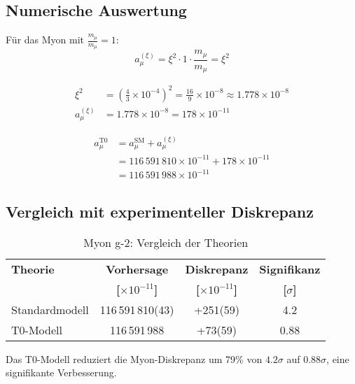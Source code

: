 \documentclass[12pt,a4paper]{article}
\newcommand{\xipar}{\xi}
\begin{document}
	\subsection{Numerische Auswertung}
	
	Für das Myon mit \(\frac{m_\mu}{m_\mu} = 1\):
	\begin{equation}
		a_\mu^{(\xipar)} = \xipar^2 \cdot 1 \cdot \frac{m_\mu}{m_\mu} = \xipar^2
	\end{equation}
	
	\begin{align}
		\xipar^2 &= \left(\frac{4}{3} \times 10^{-4}\right)^2 = \frac{16}{9} \times 10^{-8} \approx 1.778 \times 10^{-8} \\
		a_\mu^{(\xipar)} &= 1.778 \times 10^{-8} = 178 \times 10^{-11}
	\end{align}
	
	\begin{align}
		a_\mu^{\text{T0}} &= a_\mu^{\text{SM}} + a_\mu^{(\xipar)} \\
		&= 116\,591\,810 \times 10^{-11} + 178 \times 10^{-11} \\
		&= 116\,591\,988 \times 10^{-11}
	\end{align}
	
	\subsection{Vergleich mit experimenteller Diskrepanz}
	
	\begin{table}[H]
		\centering
		\caption{Myon g-2: Vergleich der Theorien}
		\begin{tabular}{@{}lccc@{}}
			\toprule
			\textbf{Theorie} & \textbf{Vorhersage} & \textbf{Diskrepanz} & \textbf{Signifikanz} \\
			& \textbf{[$\times 10^{-11}$]} & \textbf{[$\times 10^{-11}$]} & \textbf{[$\sigma$]} \\
			\midrule
			Standardmodell & 116\,591\,810(43) & +251(59) & 4.2 \\
			\rowcolor{green!20}
			T0-Modell & 116\,591\,988 & +73(59) & 0.88 \\
			\bottomrule
		\end{tabular}
	\end{table}
	
	\begin{erfolg}
		Das T0-Modell reduziert die Myon-Diskrepanz um 79\% von \(4.2\sigma\) auf \(0.88\sigma\), eine signifikante Verbesserung.
	\end{erfolg}
	
\end{document}
